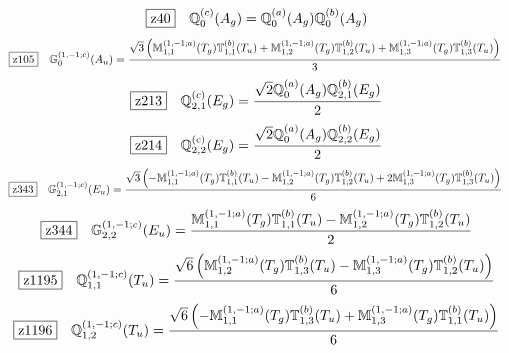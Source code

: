 \documentclass[fleqn,10pt,landscape]{jsarticle}
\begin{document}
\begin{dmath*}
\hspace*{3mm}\fbox{z40}\quad \mathbb{Q}_{0}^{(c)}(A_{g})=\mathbb{Q}_{0}^{(a)}(A_{g}) \mathbb{Q}_{0}^{(b)}(A_{g})
\end{dmath*}
\begin{dmath*}
\hspace*{3mm}\fbox{z105}\quad \mathbb{G}_{0}^{(1,-1;c)}(A_{u})=\frac{\sqrt{3} \left(\mathbb{M}_{1,1}^{(1,-1;a)}(T_{g}) \mathbb{T}_{1,1}^{(b)}(T_{u}) + \mathbb{M}_{1,2}^{(1,-1;a)}(T_{g}) \mathbb{T}_{1,2}^{(b)}(T_{u}) + \mathbb{M}_{1,3}^{(1,-1;a)}(T_{g}) \mathbb{T}_{1,3}^{(b)}(T_{u})\right)}{3}
\end{dmath*}
\begin{dmath*}
\hspace*{3mm}\fbox{z213}\quad \mathbb{Q}_{2,1}^{(c)}(E_{g})=\frac{\sqrt{2} \mathbb{Q}_{0}^{(a)}(A_{g}) \mathbb{Q}_{2,1}^{(b)}(E_{g})}{2}
\end{dmath*}
\begin{dmath*}
\hspace*{3mm}\fbox{z214}\quad \mathbb{Q}_{2,2}^{(c)}(E_{g})=\frac{\sqrt{2} \mathbb{Q}_{0}^{(a)}(A_{g}) \mathbb{Q}_{2,2}^{(b)}(E_{g})}{2}
\end{dmath*}
\begin{dmath*}
\hspace*{3mm}\fbox{z343}\quad \mathbb{G}_{2,1}^{(1,-1;c)}(E_{u})=\frac{\sqrt{3} \left(- \mathbb{M}_{1,1}^{(1,-1;a)}(T_{g}) \mathbb{T}_{1,1}^{(b)}(T_{u}) - \mathbb{M}_{1,2}^{(1,-1;a)}(T_{g}) \mathbb{T}_{1,2}^{(b)}(T_{u}) + 2 \mathbb{M}_{1,3}^{(1,-1;a)}(T_{g}) \mathbb{T}_{1,3}^{(b)}(T_{u})\right)}{6}
\end{dmath*}
\begin{dmath*}
\hspace*{3mm}\fbox{z344}\quad \mathbb{G}_{2,2}^{(1,-1;c)}(E_{u})=\frac{\mathbb{M}_{1,1}^{(1,-1;a)}(T_{g}) \mathbb{T}_{1,1}^{(b)}(T_{u}) - \mathbb{M}_{1,2}^{(1,-1;a)}(T_{g}) \mathbb{T}_{1,2}^{(b)}(T_{u})}{2}
\end{dmath*}
\begin{dmath*}
\hspace*{3mm}\fbox{z1195}\quad \mathbb{Q}_{1,1}^{(1,-1;c)}(T_{u})=\frac{\sqrt{6} \left(\mathbb{M}_{1,2}^{(1,-1;a)}(T_{g}) \mathbb{T}_{1,3}^{(b)}(T_{u}) - \mathbb{M}_{1,3}^{(1,-1;a)}(T_{g}) \mathbb{T}_{1,2}^{(b)}(T_{u})\right)}{6}
\end{dmath*}
\begin{dmath*}
\hspace*{3mm}\fbox{z1196}\quad \mathbb{Q}_{1,2}^{(1,-1;c)}(T_{u})=\frac{\sqrt{6} \left(- \mathbb{M}_{1,1}^{(1,-1;a)}(T_{g}) \mathbb{T}_{1,3}^{(b)}(T_{u}) + \mathbb{M}_{1,3}^{(1,-1;a)}(T_{g}) \mathbb{T}_{1,1}^{(b)}(T_{u})\right)}{6}
\end{dmath*}
\end{document}

